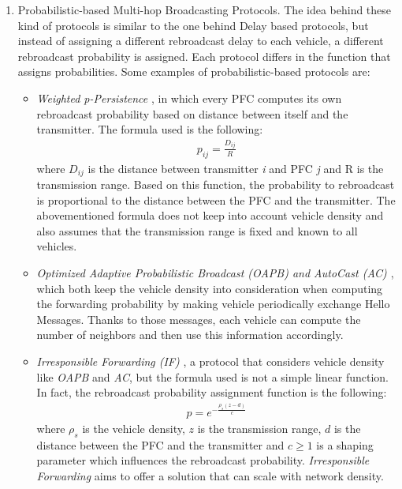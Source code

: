 \begin{enumerate}
\begin{enumerate}
			\item Probabilistic-based Multi-hop Broadcasting Protocols.
			The idea behind these kind of protocols is similar to the one behind Delay based protocols, but instead of assigning a different rebroadcast delay to each vehicle, a different rebroadcast probability is assigned. Each protocol differs in the function that assigns probabilities. Some examples of probabilistic-based protocols are:
			\begin{itemize}
				\renewcommand\labelitemi{--}
				\item \textit{Weighted p-Persistence} \cite{4407231}, in which every PFC computes its own rebroadcast probability based on distance between itself and the transmitter. The formula used is the following:
				\begin{gather}
					p_{ij} = \frac{D_{ij}}{R}
					\label{eq:weighted-p-persistence}
				\end{gather}
				where $D_{ij}$ is the distance between transmitter \textit{i} and PFC \textit{j} and R is the transmission range. Based on this function, the probability to rebroadcast is proportional to the distance between the PFC and the transmitter. The abovementioned formula does not keep into account vehicle density and also assumes that the transmission range is fixed and known to all vehicles.
				
				\item \textit{Optimized Adaptive Probabilistic Broadcast (OAPB)\cite{1543865} and AutoCast (AC) \cite{4350058}}, which both keep the vehicle density into consideration when computing the forwarding probability by making vehicle periodically exchange Hello Messages. Thanks to those messages, each vehicle can compute the number of neighbors and then use this information accordingly.
				
				\item \textit{Irresponsible Forwarding (IF)} \cite{4740277}\cite{5426212}, a protocol that considers vehicle density like \textit{OAPB} and \textit{AC}, but the formula used is not a simple linear function. In fact, the rebroadcast probability assignment function is the following:
				\begin{gather}
					p = e^{-\frac{\rho_s(z-d)}{c}}
				\end{gather}
				where $\rho_s$ is the vehicle density, $z$ is the transmission range, $d$ is the distance between the PFC and the transmitter and $c\geq1$ is a shaping parameter which influences the rebroadcast probability. \textit{Irresponsible Forwarding} aims to offer a solution that can scale with network density.
			\end{itemize}
		\end{enumerate}
		

\end{enumerate}
